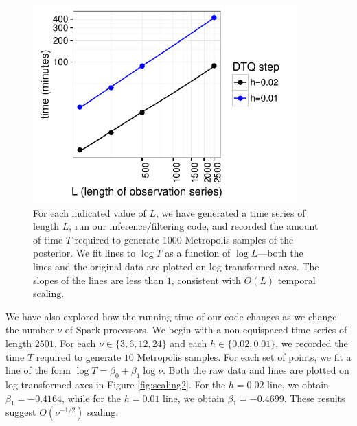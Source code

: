 \documentclass[wcp]{jmlr}
\begin{document}
\begin{figure}[th]
\begin{center}
\includegraphics[width=4in]{scaling}
\end{center}
\vspace{-0.25in}
\caption{For each indicated value of $L$, we have generated a time
  series of length $L$, run our inference/filtering code, and recorded
  the amount of time $T$ required to generate $1000$ Metropolis samples of
  the posterior.  We fit lines to $\log T$ as a function of $\log
  L$---both the lines and the original data are plotted on
  log-transformed axes.  The slopes of the lines are less than $1$,
  consistent with $O(L)$ temporal scaling.}
\label{fig:scaling}
\end{figure}

We have also explored how the running time of our code changes as we
change the number $\nu$ of Spark processors.  We begin with a non-equispaced
time series of length $2501$.  For each $\nu \in \{3, 6, 12, 24\}$ and
each $h \in \{0.02,0.01\}$, we
recorded the time $T$ required to 
generate $10$ Metropolis samples.  For each set of points, we fit a
line of the form $\log T = \beta_0 + \beta_1 \log \nu$.  Both the raw
data and lines are plotted on log-transformed axes in Figure \ref{fig:scaling2}.  For the
$h=0.02$ line, we obtain $\beta_1=-0.4164$, while for the $h=0.01$
line, we obtain $\beta_1=-0.4699$.  These results suggest $O(\nu^{-1/2})$ scaling.
\end{document}

